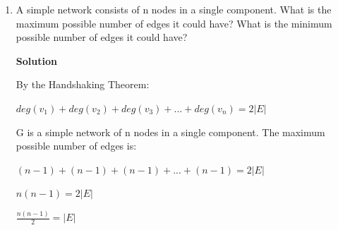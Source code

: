 \documentclass{amsart}
\theoremstyle{definition}
\theoremstyle{remark}
\numberwithin{equation}{section}
\begin{document}
\begin{enumerate}
\vspace{0.5cm}
\textbf{ \larger[3]Solution} 
\vspace{0.5cm}

\begin{enumerate}
    \item The internet, at the level of autonomous systems
    
        Undirected, Acyclic, Approximately planar 
        \vspace{0.5cm}
    \item A food web
        
        Directed, Cyclic 
        \vspace{0.5cm}
    \item The stem and branches of a plant
        
        Tree, Acyclic 
        \vspace{0.5cm}
    \item A spider web
        
        Undirected, Planar 
        \vspace{0.5cm}
    \item A complete clique of four nodes
        
        Undirected, Cyclic 
        \vspace{0.5cm}
\end{enumerate}
\vspace{5cm}
\clearpage
\item A simple network consists of n nodes in a single component. What is the maximum possible number of edges it could have? What is the minimum possible number of edges it could have? 

\vspace{0.5cm}
\textbf{ \larger[3]Solution} 
\vspace{0.5cm}

By the Handshaking Theorem:

$deg(v_1)+deg(v_2)+deg(v_3)+...+deg(v_n)=2|E|$

G is a simple network  of n nodes in a single component. The maximum possible number of edges is:

$(n-1)+(n-1)+(n-1)+...+(n-1)=2|E|$

$n(n-1)=2|E|$

$\frac{n(n-1)}{2}=|E|$
\end{enumerate}
\end{document}
